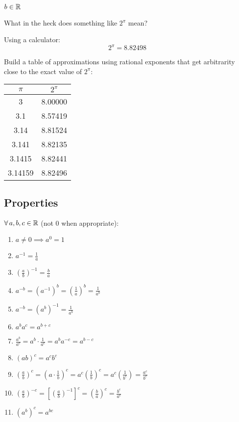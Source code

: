 \documentclass[letterpaper,12pt,fleqn]{article}
\begin{document}
\subsection*{$b\in\mathbb{R}$}

What in the heck does something like $2^{\pi}$ mean?

Using a calculator:
\[2^{\pi}=8.82498\]

Build a table of approximations using rational exponents that get arbitrarity
close to the exact value of $2^{\pi}$:

\begin{tabular}{c|c}
  $\pi$ & $2^{\pi}$ \\
  \hline
  3 & 8.00000\\
  3.1 & 8.57419 \\
  3.14 & 8.81524 \\
  3.141 & 8.82135 \\
  3.1415 & 8.82441 \\
  3.14159 & 8.82496 \\
\end{tabular}

\subsection*{Properties}

\begin{properties}
  $\forall\,a,b,c\in\mathbb{R}$ (not 0 when appropriate):
  \begin{enumerate}
  \item $a\ne0\implies a^0=1$
  \item $a^{-1}=\frac{1}{a}$
  \item $\left(\frac{a}{b}\right)^{-1}=\frac{b}{a}$
  \item $a^{-b}=\left(a^{-1}\right)^b=\left(\frac{1}{a}\right)^b=\frac{1}{a^b}$
  \item $a^{-b}=\left(a^b\right)^{-1}=\frac{1}{a^b}$
  \item $a^ba^c=a^{b+c}$
  \item $\frac{a^b}{a^c}=a^b\cdot\frac{1}{a^c}=a^ba^{-c}=a^{b-c}$
  \item $(ab)^c=a^cb^c$
  \item $\left(\frac{a}{b}\right)^c=\left(a\cdot\frac{1}{b}\right)^c=
    a^c\left(\frac{1}{b}\right)^c=a^c\left(\frac{1}{b^c}\right)=
    \frac{a^c}{b^c}$
  \item $\left(\frac{a}{b}\right)^{-c}=
    \left[\left(\frac{a}{b}\right)^{-1}\right]^c=
    \left(\frac{b}{a}\right)^c=\frac{b^c}{a^c}$
  \item $\left(a^b\right)^c=a^{bc}$
  \end{enumerate}
\end{properties}
\end{document}
